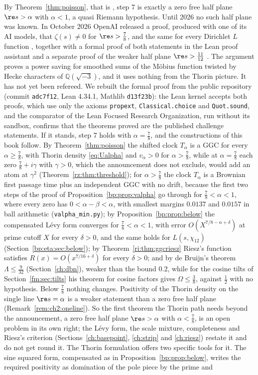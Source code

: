 By Theorem~\ref{thm:poisson}, that is \cite[Theorem 3.7 and Remark 3.10]{P26}, step 7 is exactly a zero free half plane $\re s>\alpha$ with $\alpha<1$, a quasi Riemann hypothesis. Until 2026 no such half plane was known. In October 2026 OpenAI released a proof, produced with one of its AI models, that $\zeta(s)\ne0$ for $\re s>\frac78$, and the same for every Dirichlet $L$ function \cite{OAI26a}, together with a formal proof of both statements in the Lean proof assistant and a separate proof of the weaker half plane $\re s>\frac{11}{12}$ \cite{OAI26b}. The argument proves a power saving for smoothed sums of the M\"obius function twisted by Hecke characters of $\mathbb Q(\sqrt{-3})$, and it uses nothing from the Thorin picture. It has not yet been refereed. We rebuilt the formal proof from the public repository (commit \texttt{adc7f12}, Lean 4.34.1, Mathlib \texttt{d13f23b}): the Lean kernel accepts both proofs, which use only the axioms \texttt{propext}, \texttt{Classical.choice} and \texttt{Quot.sound}, and the comparator of the Lean Focused Research Organization, run without its sandbox, confirms that the theorems proved are the published challenge statements. If it stands, step 7 holds with $\alpha=\frac78$, and the constructions of this book follow. By Theorem~\ref{thm:poisson} the shifted clock $T_\alpha$ is a GGC for every $\alpha\ge\frac78$, with Thorin density \eqref{eq:Ualpha} and $v_\alpha>0$ for $\alpha>\frac78$, while at $\alpha=\frac78$ each zero $\frac78+i\gamma$ with $\gamma>0$, which the announcement does not exclude, would add an atom at $\gamma^2$ (Theorem~\ref{rz:thm:threshold}); for $\alpha>\frac78$ the clock $T_\alpha$ is a Brownian first passage time plus an independent GGC with no drift, because the first two steps of the proof of Proposition~\ref{bp:prop:valpha} go through for $\frac78<\alpha<1$, where every zero has $0<\alpha-\beta<\alpha$, with smallest margins $0.0137$ and $0.0157$ in ball arithmetic (\texttt{valpha\_min.py}); by Proposition~\ref{bp:prop:below} the compensated L\'evy form converges for $\frac78<\alpha<1$, with error $O(X^{7/8-\alpha+\delta})$ at prime cutoff $X$ for every $\delta>0$, and the same holds for $L(s,\chi_{12})$ (Section~\ref{bp:eta:sec:below}); by Theorem~\ref{ri:thm:ggcriesz} Riesz's function satisfies $R(x)=O(x^{7/16+\delta})$ for every $\delta>0$; and by de Bruijn's theorem $\Lambda\le\frac9{32}$ (Section~\ref{ch:dbn}), weaker than the bound $0.2$, while for the cosine tilts of Section~\ref{fm:sec:tilts} his theorem for cosine factors gives $\Omega\le\frac38$, against $\frac12$ with no hypothesis. Below $\frac78$ nothing changes. Positivity of the Thorin density on the single line $\re s=\alpha$ is a weaker statement than a zero free half plane (Remark~\ref{rem:ch2:oneline}). So the first theorem the Thorin path needs beyond the announcement, a zero free half plane $\re s>\alpha$ with $\alpha<\frac78$, is an open problem in its own right; the L\'evy form, the scale mixture, completeness and Riesz's criterion (Sections~\ref{ch:basepoint}, \ref{ch:strip} and \ref{ch:riesz}) restate it and do not get round it. The Thorin formulation offers two specific tools for it. The sine squared form, compensated as in Proposition~\ref{bp:prop:below}, writes the required positivity as domination of the pole piece by the prime and 